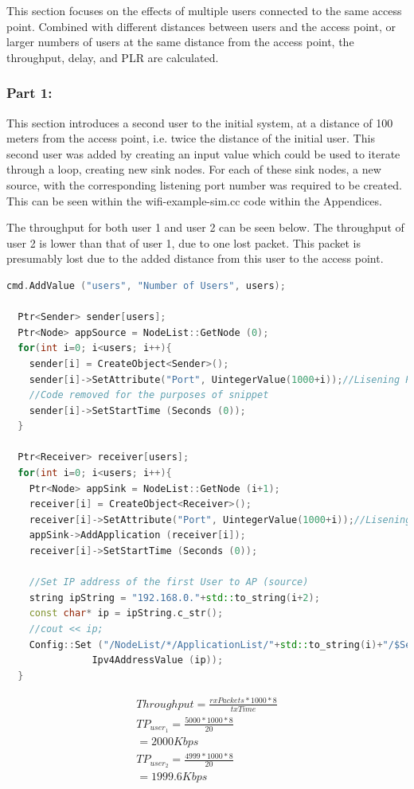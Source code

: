 This section focuses on the effects of multiple users connected to the same
access point. Combined with different distances between users and the access
point, or larger numbers of users at the same distance from the access point,
the throughput, delay, and PLR are calculated.

\subsubsection{Part 1:}

This section introduces a second user to the initial system, at a distance of
100 meters from the access point, i.e. twice the distance of the initial user.
This second user was added by creating an input value which could be used to
iterate through a loop, creating new sink nodes. For each of these sink nodes, a
new source, with the corresponding listening port number was required to be
created. This can be seen within the wifi-example-sim.cc code within the
Appendices.

The throughput for both user 1 and user 2 can be seen below. The throughput of
user 2 is lower than that of user 1, due to one lost packet. This packet is
presumably lost due to the added distance from this user to the access point.

\begin{lstlisting}[language=C++, caption=Loop Snippet for adding a source and sink to
the provided code.]
  cmd.AddValue ("users", "Number of Users", users);

  Ptr<Sender> sender[users];
  Ptr<Node> appSource = NodeList::GetNode (0);
  for(int i=0; i<users; i++){
    sender[i] = CreateObject<Sender>();
    sender[i]->SetAttribute("Port", UintegerValue(1000+i));//Lisening Port of the first WiFi user
    //Code removed for the purposes of snippet
    sender[i]->SetStartTime (Seconds (0));
  }

  Ptr<Receiver> receiver[users];
  for(int i=0; i<users; i++){
    Ptr<Node> appSink = NodeList::GetNode (i+1);
    receiver[i] = CreateObject<Receiver>();
    receiver[i]->SetAttribute("Port", UintegerValue(1000+i));//Lisening Port
    appSink->AddApplication (receiver[i]);
    receiver[i]->SetStartTime (Seconds (0));

    //Set IP address of the first User to AP (source)
    string ipString = "192.168.0."+std::to_string(i+2);
    const char* ip = ipString.c_str();
    //cout << ip;
    Config::Set ("/NodeList/*/ApplicationList/"+std::to_string(i)+"/$Sender/Destination",
               Ipv4AddressValue (ip));
  }
\end{lstlisting}
\begin{gather*}
	Throughput=\frac{rxPackets*1000*8}{txTime} \\
	TP_{user_1}=\frac{5000*1000*8}{20} \\
	= 2000 Kbps \\
	TP_{user_2}=\frac{4999*1000*8}{20} \\
	= 1999.6 Kbps \\
\end{gather*}

